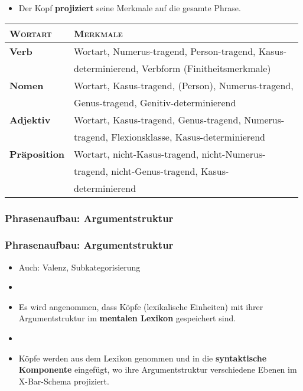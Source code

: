 \begin{frame}

\begin{itemize}
	\item Der Kopf \textbf{projiziert} seine Merkmale auf die gesamte Phrase. 
\end{itemize}

\begin{tabular}{ll}
\textsc{Wortart} & \textsc{Merkmale}\\
\hline
\textbf{Verb}		& Wortart, Numerus-tragend, Person-tragend, Kasus-\\
					& determinierend, Verbform (Finitheitsmerkmale) \\
\hline
\textbf{Nomen}		& Wortart, Kasus-tragend, (Person), Numerus-tragend,\\
					& Genus-tragend, Genitiv-determinierend\\
\hline
\textbf{Adjektiv}	& Wortart, Kasus-tragend, Genus-tragend, Numerus-\\ 
					& tragend, Flexionsklasse, Kasus-determinierend\\
\hline
\textbf{Präposition}& Wortart, nicht-Kasus-tragend, nicht-Numerus-\\
					& tragend, nicht-Genus-tragend, Kasus-\\
					& determinierend\\					
\end{tabular}
\end{frame}


\subsubsection{Phrasenaufbau: Argumentstruktur}


\begin{frame}
\frametitle{Phrasenaufbau: Argumentstruktur}

\begin{itemize}
	\item Auch: Valenz, Subkategorisierung
	\item[]
	\item Es wird angenommen, dass Köpfe (lexikalische Einheiten) \ua mit ihrer Argumentstruktur im \textbf{mentalen Lexikon} gespeichert sind.
	\item[]
	\item Köpfe werden aus dem Lexikon genommen und in die \textbf{syntaktische Komponente} eingefügt, wo ihre Argumentstruktur verschiedene Ebenen im X-Bar-Schema projiziert.
\end{itemize}

\end{frame}


